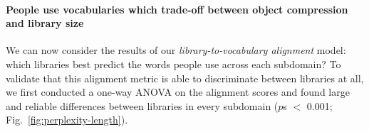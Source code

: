 \documentclass[10pt,letterpaper]{article}
\begin{document}








\paragraph{People use vocabularies which trade-off between object compression and library size}
We can now consider the results of our \textit{library-to-vocabulary alignment} model: which libraries best predict the words people use across each subdomain? 
To validate that this alignment metric is able to discriminate between libraries at all, we first conducted a one-way ANOVA on the alignment scores and found large and reliable differences between libraries in every subdomain ($p$s $<$ 0.001; Fig.~\ref{fig:perplexity-length}).
\end{document}
